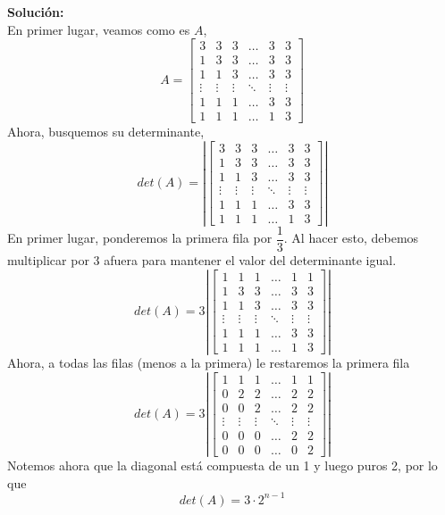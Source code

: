 \documentclass[12pt]{article}
\newenvironment{solucion}
{\begin{mdframed}[backgroundcolor=black!10]
		{\bf Solución:}\\
	}
	{
	\end{mdframed}
}
\newenvironment{preguntas}
{\begin{enumerate}\itemsep12pt
	}
	{
	\end{enumerate}
}
\begin{document}
\begin{preguntas}
\begin{solucion}
En primer lugar, veamos como es $A$,
		$$A = \begin{bmatrix}
		3 & 3 & 3 & \dots & 3 & 3 \\ 
		1 & 3 & 3 & \dots & 3 & 3 \\ 
		1 & 1 & 3 & \dots & 3 & 3 \\ 
		\vdots & \vdots & \vdots & \ddots & \vdots & \vdots \\ 
		1 & 1 & 1 & \dots & 3 & 3 \\ 
		1 & 1 & 1 & \dots & 1 & 3
		\end{bmatrix}$$
		Ahora, busquemos su determinante,
		$$det(A) = \left|\begin{bmatrix}
		3 & 3 & 3 & \dots & 3 & 3 \\ 
		1 & 3 & 3 & \dots & 3 & 3 \\ 
		1 & 1 & 3 & \dots & 3 & 3 \\ 
		\vdots & \vdots & \vdots & \ddots & \vdots & \vdots \\ 
		1 & 1 & 1 & \dots & 3 & 3 \\ 
		1 & 1 & 1 & \dots & 1 & 3
		\end{bmatrix}\right|$$
		En primer lugar, ponderemos la primera fila por $\dfrac{1}{3}$. Al hacer esto, debemos multiplicar por 3 afuera para mantener el valor del determinante igual.
		$$det(A) = 3 \left|\begin{bmatrix}
		1 & 1 & 1 & \dots & 1 & 1 \\ 
		1 & 3 & 3 & \dots & 3 & 3 \\ 
		1 & 1 & 3 & \dots & 3 & 3 \\ 
		\vdots & \vdots & \vdots & \ddots & \vdots & \vdots \\ 
		1 & 1 & 1 & \dots & 3 & 3 \\ 
		1 & 1 & 1 & \dots & 1 & 3
		\end{bmatrix}\right|$$
		Ahora, a todas las filas (menos a la primera) le restaremos la primera fila
		$$det(A) = 3 \left|\begin{bmatrix}
		1 & 1 & 1 & \dots & 1 & 1 \\ 
		0 & 2 & 2 & \dots & 2 & 2 \\ 
		0 & 0 & 2 & \dots & 2 & 2 \\ 
		\vdots & \vdots & \vdots & \ddots & \vdots & \vdots \\ 
		0 & 0 & 0 & \dots & 2 & 2 \\ 
		0 & 0 & 0 & \dots & 0 & 2
		\end{bmatrix}\right|$$
		Notemos ahora que la diagonal está compuesta de un 1 y luego puros 2, por lo que
		$$det(A) = 3 \cdot 2^{n-1}$$
\end{solucion}
\end{preguntas}
\end{document}
